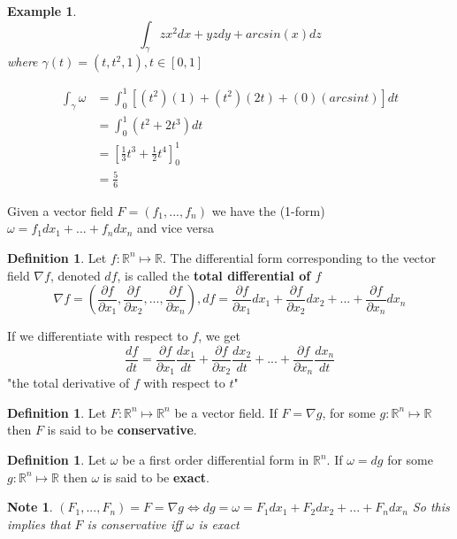\documentclass[12pt]{article}
\theoremstyle{plain}
\newtheorem*{note}{Note}
\newtheorem{example}[theorem]{Example}
\theoremstyle{definition}
\newtheorem{definition}[theorem]{Definition}
\begin{document}
\begin{example}
	$$\int_\gamma zx^2 dx + yzdy + arcsin(x)dz$$
	where $\gamma (t) = (t, t^2, 1), t\in [0,1]$

	\begin{align*}
		\int_\gamma \omega &= \int_0^1 [(t^2)(1) + (t^2)(2t) + (0)(arcsint) ]dt\\
		&= \int_0^1 (t^2+ 2t^3)dt\\
		&= [\frac{1}{3} t^3 + \frac{1}{2} t^4]_0^1\\
		&=\frac{5}{6}
	\end{align*}

\end{example}

Given a vector field $F=(f_1, ...,f_n)$ we have the (1-form) $\omega = f_1 dx_1 + ... + f_n dx_n$ and vice versa

\begin{definition}
	Let $f:\mathbb{R}^n \mapsto \mathbb{R}$. The differential form corresponding to the vector field $\nabla f$, denoted $df$, is called the \textbf{total differential of $f$}
	$$\nabla f = (\frac{\partial f}{\partial x_1}, \frac{\partial f}{\partial x_2}, ..., \frac{\partial f}{\partial x_n}), df = \frac{\partial f}{\partial x_1} d x_1 + \frac{\partial f}{\partial x_2} d x_2 + ... + \frac{\partial f}{\partial x_n} d x_n$$
\end{definition}

If we differentiate with respect to $f$, we get
$$\frac{df}{dt} = \frac{\partial f}{\partial x_1} \frac{d x_1}{dt} + \frac{\partial f}{\partial x_2} \frac{d x_2}{dt} + ... + \frac{\partial f}{\partial x_n} \frac{d x_n}{dt}$$
"the total derivative of $f$ with respect to $t$"

\begin{definition}
	Let $F:\mathbb{R}^n \mapsto \mathbb{R}^n$ be a vector field. If $F = \nabla g$, for some $g: \mathbb{R}^n \mapsto \mathbb{R}$ then $F$ is said to be \textbf{conservative}.
\end{definition}

\begin{definition}
	Let $\omega$ be a first order differential form in $\mathbb{R}^n$. If $\omega = dg$ for some $g: \mathbb{R}^n \mapsto \mathbb{R}$ then $\omega$ is said to be \textbf{exact}.
\end{definition}

\begin{note}
	$(F_1, ..., F_n) = F = \nabla g \Longleftrightarrow dg = \omega = F_1 dx_1 + F_2 dx_2 + ... + F_n dx_n$
	So this implies that $F$ is conservative iff $\omega$ is exact
\end{note}
\end{document}
